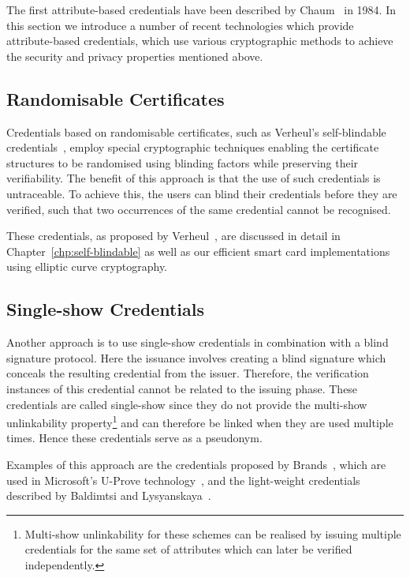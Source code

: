 The first attribute-based credentials have been described by
Chaum~\cite{Chaum1985} in 1984. In this section we introduce a number of recent
technologies which provide attribute-based credentials, which use various
cryptographic methods to achieve the security and privacy properties mentioned
above.

\subsection{Randomisable Certificates}

Credentials based on randomisable certificates,
such as Verheul's self-blindable credentials~\cite{Verheul01}, employ special
cryptographic techniques enabling the certificate structures to be randomised
using blinding factors while preserving their verifiability. The benefit of this
 approach is that the use of such credentials is
untraceable. To achieve this, the users can blind their credentials before they
are verified, such that two occurrences of the same credential cannot be
recognised.

These credentials, as proposed by Verheul~\cite{Verheul01}, are discussed in
detail in Chapter~\ref{chp:self-blindable} as well as our efficient smart card
implementations~\cite{BatinaHJMV10,HoepmanJV10} using elliptic curve
cryptography.

\subsection{Single-show Credentials}

Another approach is to use single-show credentials in combination with a blind signature protocol. Here the issuance involves creating a blind signature which
conceals the resulting credential from the issuer. Therefore, the verification
instances of this credential cannot be related to the issuing phase. These
credentials are called single-show since they do not provide the multi-show
unlinkability property\footnote{Multi-show unlinkability for these schemes can
be realised by issuing multiple credentials for the same set of attributes which
can later be verified independently.} and can therefore be linked when they are
used multiple times. Hence these credentials serve as a pseudonym.

Examples of this approach are the credentials proposed by
Brands~\cite{Brands2000}, which are used in Microsoft's U-Prove
technology~\cite{U-Prove_Crypto2013}, and the light-weight credentials described
by Baldimtsi and Lysyanskaya~\cite{BaLy2012}.

